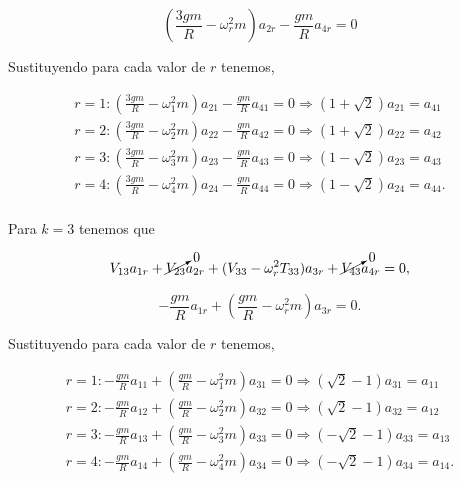 \documentclass[a4paper,10pt]{article}
\numberwithin{equation}{section}
\begin{document}
\begin{equation}
 \left( \frac{3gm}{R} - \omega_r^2m\right)a_{2r} - \frac{gm}{R} a_{4r} = 0
\end{equation}

Sustituyendo para cada valor de $r$ tenemos,

\begin{align}
 r = 1:  \left(\frac{3gm}{R} -  \omega_1^2m\right)a_{21} - \frac{gm}{R} a_{41} = 0 \Rightarrow
 (1+ \sqrt{2})a_{21} = a_{41} \\
 r = 2:  \left(\frac{3gm}{R} - \omega_2^2m\right)a_{22} - \frac{gm}{R} a_{42} = 0 \Rightarrow
 (1+ \sqrt{2})a_{22} = a_{42} \\
 r = 3:  \left(\frac{3gm}{R} - \omega_3^2m\right)a_{23} - \frac{gm}{R} a_{43} = 0 \Rightarrow
 (1 - \sqrt{2})a_{23} = a_{43} \\
 r = 4:  \left(\frac{3gm}{R} - \omega_4^2m\right)a_{24} - \frac{gm}{R} a_{44} = 0 \Rightarrow
 (1 - \sqrt{2})a_{24} = a_{44}. \\
\end{align}

Para $k=3$ tenemos que

\begin{equation}
 V_{13}a_{1r} + \cancelto{0}{V_{23}}a_{2r} + (V_{33} - \omega_r^2T_{33})a_{3r} + \cancelto{0}{V_{43}}a_{4r} = 0,
\end{equation}

\begin{equation}
 - \frac{gm}{R}a_{1r} + \left(\frac{gm}{R} - \omega_r^2m \right)a_{3r} = 0.
\end{equation}

Sustituyendo para cada valor de $r$ tenemos,

\begin{align}
 r = 1:  - \frac{gm}{R} a_{11} + \left(\frac{gm}{R} -  \omega_1^2m\right)a_{31}  = 0 \Rightarrow
 (\sqrt{2} -1)a_{31} = a_{11} \\
 r = 2: - \frac{gm}{R} a_{12} + \left(\frac{gm}{R} -  \omega_2^2m\right)a_{32} = 0 \Rightarrow
 (\sqrt{2} -1)a_{32} = a_{12} \\
 r = 3:  - \frac{gm}{R} a_{13} + \left(\frac{gm}{R} -  \omega_3^2m\right)a_{33} = 0 \Rightarrow
 (- \sqrt{2} -1)a_{33} = a_{13} \\
 r = 4:  - \frac{gm}{R} a_{14} + \left(\frac{gm}{R} -  \omega_4^2m\right)a_{34} = 0 \Rightarrow
 (- \sqrt{2} -1)a_{34} = a_{14}. \\
\end{align}
\end{document}

